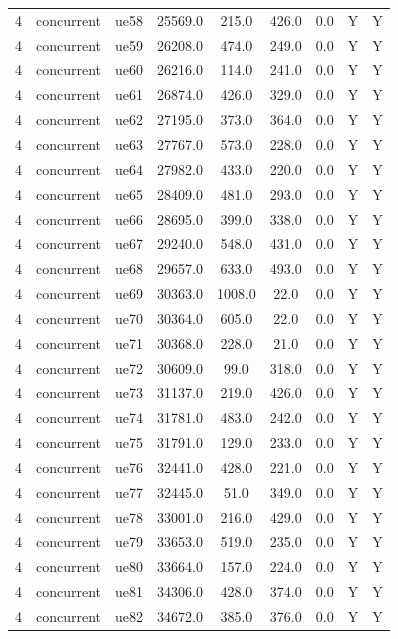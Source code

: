 \begin{table}[ht]
\begin{tabular}{|c|c|c|c|c|c|c|c|c|}
4 & concurrent & ue58 & 25569.0 & 215.0 & 426.0 & 0.0 & Y & Y \\
4 & concurrent & ue59 & 26208.0 & 474.0 & 249.0 & 0.0 & Y & Y \\
4 & concurrent & ue60 & 26216.0 & 114.0 & 241.0 & 0.0 & Y & Y \\
4 & concurrent & ue61 & 26874.0 & 426.0 & 329.0 & 0.0 & Y & Y \\
4 & concurrent & ue62 & 27195.0 & 373.0 & 364.0 & 0.0 & Y & Y \\
4 & concurrent & ue63 & 27767.0 & 573.0 & 228.0 & 0.0 & Y & Y \\
4 & concurrent & ue64 & 27982.0 & 433.0 & 220.0 & 0.0 & Y & Y \\
4 & concurrent & ue65 & 28409.0 & 481.0 & 293.0 & 0.0 & Y & Y \\
4 & concurrent & ue66 & 28695.0 & 399.0 & 338.0 & 0.0 & Y & Y \\
4 & concurrent & ue67 & 29240.0 & 548.0 & 431.0 & 0.0 & Y & Y \\
4 & concurrent & ue68 & 29657.0 & 633.0 & 493.0 & 0.0 & Y & Y \\
4 & concurrent & ue69 & 30363.0 & 1008.0 & 22.0 & 0.0 & Y & Y \\
4 & concurrent & ue70 & 30364.0 & 605.0 & 22.0 & 0.0 & Y & Y \\
4 & concurrent & ue71 & 30368.0 & 228.0 & 21.0 & 0.0 & Y & Y \\
4 & concurrent & ue72 & 30609.0 & 99.0 & 318.0 & 0.0 & Y & Y \\
4 & concurrent & ue73 & 31137.0 & 219.0 & 426.0 & 0.0 & Y & Y \\
4 & concurrent & ue74 & 31781.0 & 483.0 & 242.0 & 0.0 & Y & Y \\
4 & concurrent & ue75 & 31791.0 & 129.0 & 233.0 & 0.0 & Y & Y \\
4 & concurrent & ue76 & 32441.0 & 428.0 & 221.0 & 0.0 & Y & Y \\
4 & concurrent & ue77 & 32445.0 & 51.0 & 349.0 & 0.0 & Y & Y \\
4 & concurrent & ue78 & 33001.0 & 216.0 & 429.0 & 0.0 & Y & Y \\
4 & concurrent & ue79 & 33653.0 & 519.0 & 235.0 & 0.0 & Y & Y \\
4 & concurrent & ue80 & 33664.0 & 157.0 & 224.0 & 0.0 & Y & Y \\
4 & concurrent & ue81 & 34306.0 & 428.0 & 374.0 & 0.0 & Y & Y \\
4 & concurrent & ue82 & 34672.0 & 385.0 & 376.0 & 0.0 & Y & Y \\

\end{tabular}
\end{table}
